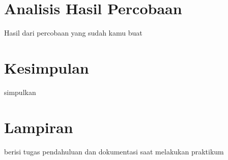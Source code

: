 \section{Analisis Hasil Percobaan}
Hasil dari percobaan yang sudah kamu buat
\section{Kesimpulan}
simpulkan
\section{Lampiran}
berisi tugas pendahuluan dan dokumentasi saat melakukan praktikum